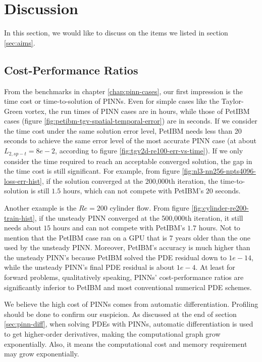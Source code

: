 
\section{Discussion}

In this section, we would like to discuss on the items we listed in section \ref{sec:aims}.

\subsection*{Cost-Performance Ratios}

From the benchmarks in chapter \ref{chap:pinn-cases}, our first impression is the time cost or time-to-solution of PINNs.
Even for simple cases like the Taylor-Green vortex, the run times of PINN cases are in hours, while those of PetIBM cases (figure \ref{fig:petibm-tgv-spatial-temporal-error}) are in seconds.
If we consider the time cost under the same solution error level, PetIBM needs less than 20 seconds to achieve the same error level of the most accurate PINN case (at about $L_{2,sp-t}=8e-2$, according to figure \ref{fig:tgv2d-re100-err-vs-time}).
If we only consider the time required to reach an acceptable converged solution, the gap in the time cost is still significant.
For example, from figure \ref{fig:nl3-nn256-npts4096-loss-err-hist}, if the solution converged at the 200,000th iteration, the time-to-solution is still $1.5$ hours, which can not compete with PetIBM's $20$ seconds.

Another example is the $Re=200$ cylinder flow.
From figure \ref{fig:cylinder-re200-train-hist}, if the unsteady PINN converged at the 500,000th iteration, it still needs about $15$ hours and can not compete with PetIBM's $1.7$ hours.
Not to mention that the PetIBM case ran on a GPU that is 7 years older than the one used by the unsteady PINN.
Moreover, PetIBM's accuracy is much higher than the unsteady PINN's because PetIBM solved the PDE residual down to $1e-14$, while the unsteady PINN's final PDE residual is about $1e-4$.
At least for forward problems, qualitatively speaking, PINNs' cost-performance ratios are significantly inferior to PetIBM and most conventional numerical PDE schemes.

We believe the high cost of PINNs comes from automatic differentiation.
Profiling should be done to confirm our suspicion.
As discussed at the end of section \ref{sec:pinn-diff}, when solving PDEs with PINNs, automatic differentiation is used to get higher-order derivatives, making the computational graph grow exponentially.
Also, it means the computational cost and memory requirement may grow exponentially.

